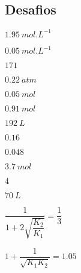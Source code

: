 \subsection*{Desafios}
\small 
\begin{answers}
[start = 69]\item 
\begin{answers}
[start = 1]\item \(\qty{1,95}{\unit{mol.L^{-1}}}\)

\item \(\qty{0,05}{\unit{mol.L^{-1}}}\)

\end{answers}

\item 
\begin{answers}
[start = 1]\item \(\num{171}\)

\item \(\qty{0,22}{\unit{atm}}\)

\end{answers}

\item 
\begin{answers}
[start = 1]\item \(\qty{0,05}{\unit{mol}}\)

\item \(\qty{0,91}{\unit{mol}}\)

\item \(\qty{192}{\unit{L}}\)

\end{answers}

\item 
\begin{answers}
[start = 1]\item \(\num{0,16}\)

\item \(\num{0,048}\)

\end{answers}

\item 
\begin{answers}
[start = 1]\item \(\qty{3,7}{\unit{mol}}\)

\item \(4\)

\item \(\qty{70}{\unit{L}}\)

\end{answers}

\item 
\begin{answers}
[start = 1]\item \(\dfrac{1}{1 + 2\sqrt{\dfrac{K_2}{K_1}}} = \dfrac{1}{3}\)

\item \(1 + \dfrac{1}{\sqrt{K_1K_2}} = \num{1,05}\)

\end{answers}

\end{answers}
